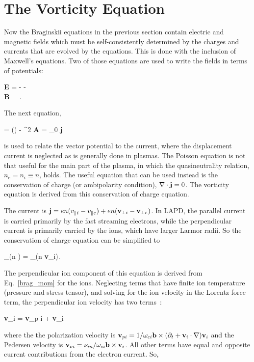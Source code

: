 \section{The Vorticity Equation}
\label{s_vorticity_eqn}

Now the Braginskii equations in the previous section contain electric and magnetic fields which must be self-consistently determined by the charges and currents that are evolved by the equations. 
This is done with the inclusion of Maxwell's equations. Two of those equations are used to write the fields in terms of potentials:

\beqar
\label{gauge}
{\bf E} = - \grad \phi -  \\ \nonumber
{\bf B} = \nabla {}.
\eeqar

The next equation,

\beq
\label{maxwell}
\grad {} = \grad(\grad {}) - \grad^2 {\bf A} = \mu_0 {\bf j}
\eeq

is used to relate the vector potential to the current, where the displacement current is neglected as is generally done in plasmas. The Poisson equation is not that useful for the main part
of the plasma, in which the quasineutrality relation, $n_e = n_i \equiv n$, holds. The useful equation that can be used instead is the conservation of charge (or ambipolarity condition), 
$\nabla \cdot {\bf j} = 0$. The vorticity equation is derived from this conservation of charge equation.

The current is ${\bf j} = e n (v_{\parallel i} - v_{\parallel e}) + e n ({\bf v}_{\perp i} - {\bf v}_{\perp e}) $. In LAPD, the parallel current is carried primarily by the fast streaming electrons, while the
perpendicular current is primarily carried by the ions, which have larger Larmor radii. So the conservation of charge equation can be simplified to

\beq
\label{simp_charge_cons}
\nabla_\para (n \vpe) = \nabla_\perp \cdot (n {\bf v}_{\perp i}).
\eeq

The perpendicular ion component of this equation is derived from Eq.~\ref{brag_mom} for the ions. Neglecting terms that have finite ion temperature (pressure and stress tensor), and solving
for the ion velocity in the Lorentz force term, the perpendicular ion velocity has two terms~\cite{Popovich2010a,simakov2003}:

\beq
\label{perp_ion_vel}
{\bf v}_{\perp i} = {\bf v}_{p i} + {\bf v}_{\nu i}
\eeq

where the the polarization velocity is ${\bf v}_{p i} = 1/\omega_{c i} {\bf b} \times (\partial_t + {\bf v}_i \cdot \nabla) {\bf v}_i$ and the Pedersen velocity is 
${\bf v}_{\nu i} = \nu_{in}/\omega_{c i} {\bf b} \times {\bf v}_i$. All other terms have equal and opposite current contributions from the electron current. So,

